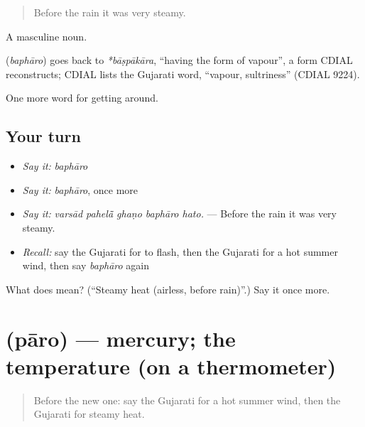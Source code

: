 \begin{quote}
Before the rain it was very steamy.
\end{quote}

A masculine noun.

\begin{cousinweb}
\textbf{} (\emph{baphāro}) goes back to \emph{*bāṣpākāra}, \textquotedblleft{}having the form of vapour\textquotedblright{}, a form CDIAL reconstructs; CDIAL lists the Gujarati word, \textquotedblleft{}vapour, sultriness\textquotedblright{} (CDIAL 9224).
\end{cousinweb}

\begin{grammarlens}[title={What you've built}]
One more word for getting around.
\end{grammarlens}

\subsection*{Your turn}
\begin{itemize}
\raggedright
  \item \emph{Say it:} \emph{baphāro}
  \item \emph{Say it:} \emph{baphāro}, once more
  \item \emph{Say it:} \emph{varsād pahelā̃ ghaṇo baphāro hato.} — Before the rain it was very steamy.
  \item \emph{Recall:} say the Gujarati for to flash, then the Gujarati for a hot summer wind, then say \emph{baphāro} again
\end{itemize}

\begin{tcolorbox}[breakable,colback=teal!4,colframe=teal!35!black,title={Before you move on}]
What does  mean? (\textquotedblleft{}Steamy heat (airless, before rain)\textquotedblright{}.) Say it once more.
\end{tcolorbox}
\section[\texorpdfstring{\gu{પારો} (pāro)}{પારો (pāro)}]{ (pāro) — mercury; the temperature (on a thermometer)}

\label{lesson:GU-C436-paro}



\begin{quote}
Before the new one: say the Gujarati for a hot summer wind, then the Gujarati for steamy heat.
\end{quote}


